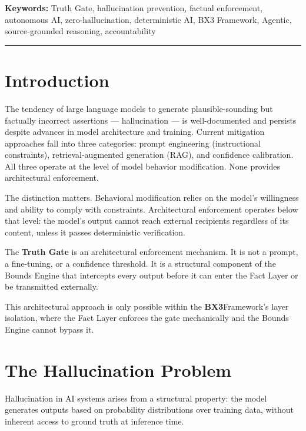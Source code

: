 \documentclass[12pt]{article}
\newcommand{\bxthree}{\textbf{BX3}}
\begin{document}
\vspace{0.5em}
\noindent\textbf{Keywords:} Truth Gate, hallucination prevention, factual enforcement, autonomous AI, zero-hallucination, deterministic AI, BX3 Framework, Agentic, source-grounded reasoning, accountability

\vspace{1em}
\hrule
\vspace{1em}

\section{Introduction}
\label{sec:intro}

The tendency of large language models to generate plausible-sounding but factually incorrect assertions --- hallucination --- is well-documented and persists despite advances in model architecture and training. Current mitigation approaches fall into three categories: prompt engineering (instructional constraints), retrieval-augmented generation (RAG), and confidence calibration. All three operate at the level of model behavior modification. None provides architectural enforcement.

The distinction matters. Behavioral modification relies on the model's willingness and ability to comply with constraints. Architectural enforcement operates below that level: the model's output cannot reach external recipients regardless of its content, unless it passes deterministic verification.

The \textbf{Truth Gate} is an architectural enforcement mechanism. It is not a prompt, a fine-tuning, or a confidence threshold. It is a structural component of the Bounds Engine that intercepts every output before it can enter the Fact Layer or be transmitted externally.

This architectural approach is only possible within the \bxthree Framework's layer isolation, where the Fact Layer enforces the gate mechanically and the Bounds Engine cannot bypass it.

\section{The Hallucination Problem}
\label{sec:problem}

Hallucination in AI systems arises from a structural property: the model generates outputs based on probability distributions over training data, without inherent access to ground truth at inference time.
\end{document}
